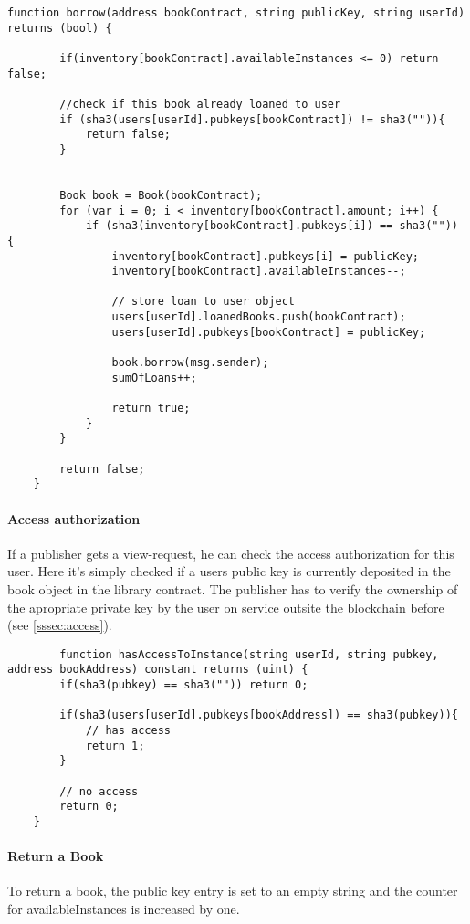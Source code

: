 \begin{lstlisting}
function borrow(address bookContract, string publicKey, string userId) returns (bool) {

		if(inventory[bookContract].availableInstances <= 0) return false;

		//check if this book already loaned to user
        if (sha3(users[userId].pubkeys[bookContract]) != sha3("")){
            return false;
        }


		Book book = Book(bookContract);
        for (var i = 0; i < inventory[bookContract].amount; i++) {
            if (sha3(inventory[bookContract].pubkeys[i]) == sha3("")) {
                inventory[bookContract].pubkeys[i] = publicKey;
                inventory[bookContract].availableInstances--;

                // store loan to user object
                users[userId].loanedBooks.push(bookContract);
                users[userId].pubkeys[bookContract] = publicKey;

                book.borrow(msg.sender);
                sumOfLoans++;

                return true;
            }
        }

        return false;
	}
\end{lstlisting}

\paragraph*{Access authorization}
If a publisher gets a view-request, he can check the access authorization for this user. Here it's simply checked if a users public key is currently deposited in the book object in the library contract.
The publisher has to verify the ownership of the apropriate private key by the user on service outsite the blockchain before (see \ref{sssec:access}).

\begin{lstlisting}
	    function hasAccessToInstance(string userId, string pubkey, address bookAddress) constant returns (uint) {
        if(sha3(pubkey) == sha3("")) return 0;

        if(sha3(users[userId].pubkeys[bookAddress]) == sha3(pubkey)){
            // has access
            return 1;
        }

        // no access
        return 0;
    }
\end{lstlisting}


\paragraph*{Return a Book}
To return a book, the public key entry is set to an empty string and the counter for availableInstances is increased by one.

